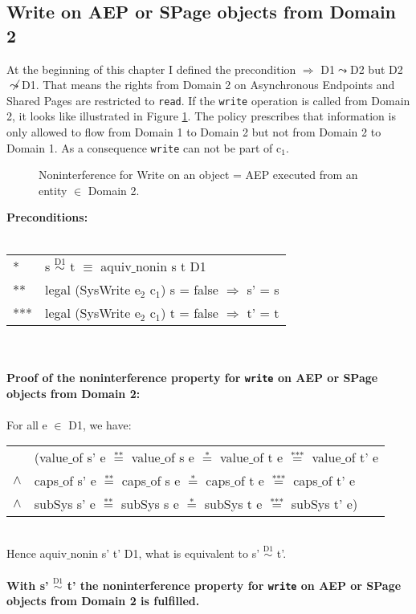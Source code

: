 \subsection{Write on AEP or SPage objects from Domain 2}\label{WriteOut}
At the beginning of this chapter I defined the precondition $\Rightarrow$ D1$\leadsto$D2 but D2$\not\leadsto$D1. That means the rights from Domain 2 on Asynchronous Endpoints and Shared Pages are restricted to \texttt{read}. 
If the \texttt{write} operation is called from Domain 2, it looks like illustrated in Figure \ref{fig:WriteOut1}. The policy prescribes that information is only allowed to flow from Domain 1 to Domain 2 but not from Domain 2 to Domain 1. As a consequence \texttt{write} can not be part of c$_1$. 
\begin{figure}[H]
\caption{Noninterference for Write on an object = AEP executed from an entity $\in$ Domain 2.}
\label{fig:WriteOut1}
\end{figure}
\textbf{Preconditions:} \\ \\
\begin{tabular}{ll}
* & s $\overset{\text{D1}}{\sim}$ t $\equiv$ aquiv$\_$nonin s t D1	\\ 
** & legal (SysWrite e$_2$ c$_1$) s = false $\Rightarrow$ s' = s \\ 
*** & legal (SysWrite e$_2$ c$_1$) t = false $\Rightarrow$ t' = t
\end{tabular} \\ \\ 
\textbf{Proof of the noninterference property for \texttt{write} on AEP or SPage objects from Domain 2:}\\ \\
For all e $\in$ D1, we have: \\ 
\begin{tabular}{ll}
& (value$\_$of s' e $\overset{\text{**}}{=}$ value$\_$of s e $\overset{\text{*}}{=}$ value$\_$of t e $\overset{\text{***}}{=}$ value$\_$of t' e \\
$\wedge$ & caps$\_$of s' e $\overset{\text{**}}{=}$ caps$\_$of s e $\overset{\text{*}}{=}$ caps$\_$of t e $\overset{\text{***}}{=}$ caps$\_$of t' e \\
$\wedge$ & subSys s' e $\overset{\text{**}}{=}$ subSys s e $\overset{\text{*}}{=}$ subSys t e $\overset{\text{***}}{=}$ subSys t' e)
\end{tabular} \\
Hence aquiv$\_$nonin s' t' D1, what is equivalent to s' $\overset{\text{D1}}{\sim}$ t'.\\ \\ 
\textbf{With s' $\overset{\text{D1}}{\sim}$ t' the noninterference property for \texttt{write} on AEP or SPage objects from Domain 2 is fulfilled.}  
\clearpage
